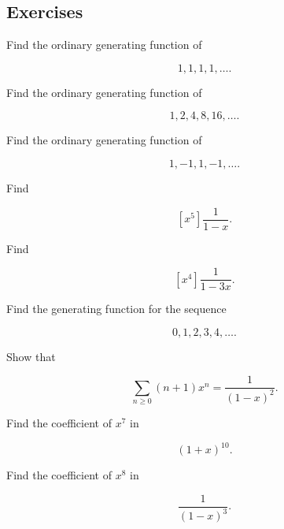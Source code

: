\subsection{Exercises}
\label{subsec:generating-functions-exercises}

\begin{exercise}[1]
Find the ordinary generating function of

\[
1,1,1,1,\ldots.
\]
\end{exercise}

\begin{exercise}[1]
Find the ordinary generating function of

\[
1,2,4,8,16,\ldots.
\]
\end{exercise}

\begin{exercise}[1]
Find the ordinary generating function of

\[
1,-1,1,-1,\ldots.
\]
\end{exercise}

\begin{exercise}[1]
Find

\[
[x^5]\frac{1}{1-x}.
\]
\end{exercise}

\begin{exercise}[1]
Find

\[
[x^4]\frac{1}{1-3x}.
\]
\end{exercise}

\begin{exercise}[1]
Find the generating function for the sequence

\[
0,1,2,3,4,\ldots.
\]
\end{exercise}

\begin{exercise}[1]
Show that

\[
\sum_{n\geq0}(n+1)x^n
=
\frac{1}{(1-x)^2}.
\]
\end{exercise}

\begin{exercise}[1]
Find the coefficient of \(x^7\) in

\[
(1+x)^{10}.
\]
\end{exercise}

\begin{exercise}[1]
Find the coefficient of \(x^8\) in

\[
\frac{1}{(1-x)^3}.
\]
\end{exercise}

